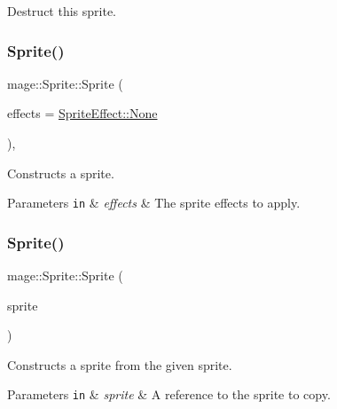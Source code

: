 Destruct this sprite. \hypertarget{classmage_1_1_sprite_a4e7926b7fd1455afcb95e45f25b83246}{}\label{classmage_1_1_sprite_a4e7926b7fd1455afcb95e45f25b83246} 
\subsubsection{\texorpdfstring{Sprite()}{Sprite()}\hspace{0.1cm}{\footnotesize\ttfamily [1/3]}}
{\footnotesize\ttfamily mage\+::\+Sprite\+::\+Sprite (\begin{DoxyParamCaption}\item[{\hyperlink{namespacemage_a9cfe18123066ba4236f548f9de75d881}{Sprite\+Effect}}]{effects = {\ttfamily \hyperlink{namespacemage_a5e7e18b0154373ce8fc942fe3f6b27fda6adf97f83acf6453d4a6a4b1070f3754}{Sprite\+Effect\+::\+None}} }\end{DoxyParamCaption})\hspace{0.3cm}{\ttfamily [explicit]}, {\ttfamily [protected]}}

Constructs a sprite.


\begin{DoxyParams}[1]{Parameters}
\mbox{\tt in}  & {\em effects} & The sprite effects to apply. \\
\hline
\end{DoxyParams}
\hypertarget{classmage_1_1_sprite_a9c1eb4f5a85e1fa17479012dd22114a9}{}\label{classmage_1_1_sprite_a9c1eb4f5a85e1fa17479012dd22114a9} 
\subsubsection{\texorpdfstring{Sprite()}{Sprite()}\hspace{0.1cm}{\footnotesize\ttfamily [2/3]}}
{\footnotesize\ttfamily mage\+::\+Sprite\+::\+Sprite (\begin{DoxyParamCaption}\item[{const \hyperlink{classmage_1_1_sprite}{Sprite} \&}]{sprite }\end{DoxyParamCaption})\hspace{0.3cm}{\ttfamily [protected]}}

Constructs a sprite from the given sprite.


\begin{DoxyParams}[1]{Parameters}
\mbox{\tt in}  & {\em sprite} & A reference to the sprite to copy. \\
\hline
\end{DoxyParams}
\hypertarget{classmage_1_1_sprite_a84d01e440d0a8105d45a3e18a0698d07}{}\label{classmage_1_1_sprite_a84d01e440d0a8105d45a3e18a0698d07} 
